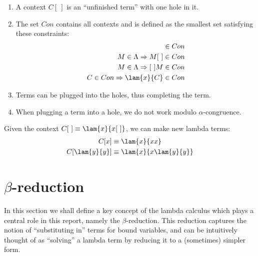 \begin{definition}
	\begin{enumerate}
		\item A context $C[\ ]$ is an ``unfinished term'' with one hole in it. 
		\item The set $Con$ contains all contexts and is defined as the smallest
		set satisfying these constraints:
		\begin{align*}
			[\ ]&\in Con \\
			M\in\Lambda\Rightarrow M[\ ]&\in Con \\
			M\in\Lambda\Rightarrow [\ ]M&\in Con \\
			C\in Con\Rightarrow \lam{x}{C} &\in Con
		\end{align*}
		\item Terms can be plugged into the holes, thus completing the term. 
		\item When plugging a term into a hole, we do not work modulo 
		$\alpha$-congruence.
	\end{enumerate}
\end{definition}
\begin{example}
	Given the context $C[\ ]\equiv\lam{x}{x[\ ]}$, we can make new lambda terms:
	\begin{align*}
		C[x]&\equiv\lam{x}{xx} \\
		C[\lam{y}{y}]&\equiv\lam{x}{x\lam{y}{y}}
	\end{align*}
\end{example}

\section{$\beta$-reduction}

In this section we shall define a key concept of the lambda calculus which
plays a central role in this report, namely the $\beta$-reduction. This
reduction captures the notion of ``substituting in'' terms for bound variables,
and can be intuitively thought of as ``solving'' a lambda term by reducing it
to a (sometimes) simpler form.

